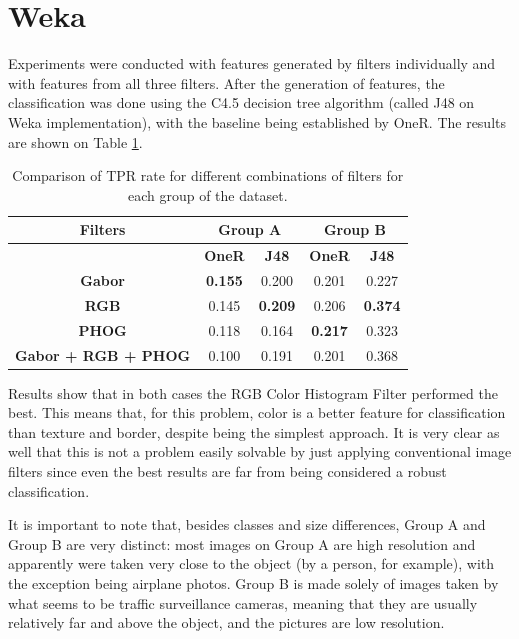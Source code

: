 \documentclass{article}
\begin{document}
\section*{Weka}

Experiments were conducted with features generated by filters individually and with features from all three filters. After the generation of features, the classification was done using the C4.5 decision tree algorithm (called J48 on Weka implementation), with the baseline being established by OneR. The results are shown on Table \ref{tab:weka_table}.

\begin{table}[hbtp]
    \centering
    \begin{tabular}{c|c|c|c|c}
        \textbf{Filters} & \multicolumn{2}{c|}{\textbf{Group A}} & \multicolumn{2}{c}{\textbf{Group B}} \\ \hline
         & \textbf{OneR} & \textbf{J48} & \textbf{OneR} & \textbf{J48}  \\
         \textbf{Gabor} & \textbf{0.155} & 0.200 & 0.201 & 0.227 \\
         \textbf{RGB} & 0.145 & \textbf{0.209} & 0.206 & \textbf{0.374} \\
         \textbf{PHOG} & 0.118 & 0.164 & \textbf{0.217} & 0.323 \\
         \textbf{Gabor + RGB + PHOG} & 0.100 & 0.191 & 0.201 & 0.368 \\
     \end{tabular}
    \caption{Comparison of TPR rate for different combinations of filters for each group of the dataset.}
    \label{tab:weka_table}
\end{table}


Results show that in both cases the RGB Color Histogram Filter performed the best. This means that, for this problem, color is a better feature for classification than texture and border, despite being the simplest approach. It is very clear as well that this is not a problem easily solvable by just applying conventional image filters since even the best results are far from being considered a robust classification.

It is important to note that, besides classes and size differences, Group A and Group B are very distinct: most images on Group A are high resolution and apparently were taken very close to the object (by a person, for example), with the exception being airplane photos. Group B is made solely of images taken by what seems to be traffic surveillance cameras, meaning that they are usually relatively far and above the object, and the pictures are low resolution.
\end{document}

